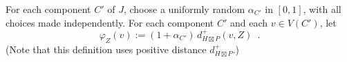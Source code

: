 \documentclass{patmorin}
\renewcommand{\ge}{\geqslant}
\begin{document}
%
%
%

For each component $C'$ of $J$, choose a uniformly random $\alpha_{C'}$ in $[0,1]$, with all choices made independently. For each component $C'$ and each $v \in V(C')$, let
\[
  \varphi_{Z}(v):=(1+\alpha_{C'})\,d^+_{H\boxtimes P}(v,Z) \enspace .
\]
(Note that this definition uses positive distance $d^+_{H\boxtimes P}$.)
\end{document}
